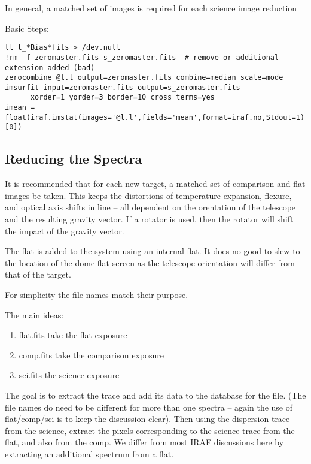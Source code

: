 \newpage
In general, a matched set of images is required for each science image
reduction

Basic Steps:

\begingroup \fontsize{10pt}{10pt}
\selectfont
\begin{verbatim} 
ll t_*Bias*fits > /dev.null
!rm -f zeromaster.fits s_zeromaster.fits  # remove or additional extension added (bad)
zerocombine @l.l output=zeromaster.fits combine=median scale=mode
imsurfit input=zeromaster.fits output=s_zeromaster.fits 
      xorder=1 yorder=3 border=10 cross_terms=yes
imean = float(iraf.imstat(images='@l.l',fields='mean',format=iraf.no,Stdout=1)[0])
\end{verbatim}
\endgroup

\subsection{Reducing the Spectra}

It is recommended that for each new target, a matched set of comparison
and flat images be taken. This keeps the distortions of temperature
expansion, flexure, and optical axis shifts in line -- all dependent
on the orentation of the telescope and the resulting gravity vector.
If a rotator is used, then the rotator will shift the impact of the
gravity vector.

The flat is added to the system using an internal flat. It does no
good to slew to the location of the dome flat screen as the telescope
orientation will differ from that of the target.

For simplicity the file names match their purpose.

The main ideas:
\vspace{-.15cm}
\begin{enumerate}\addtolength{\itemsep}{-0.5\baselineskip}
   \item   flat.fits take the flat exposure
   \item   comp.fits take the comparison exposure
   \item   sci.fits  the science exposure
\end{enumerate}

The goal is to extract the trace and add its data to the database for
the file. (The file names do need to be different for more than one
spectra -- again the use of flat/comp/sci is to keep the discussion
clear). Then using the dispersion trace from the science, extract the
pixels corresponding to the science trace from the flat, and also from
the comp. We differ from most IRAF discussions here by extracting an
additional spectrum from a flat.


